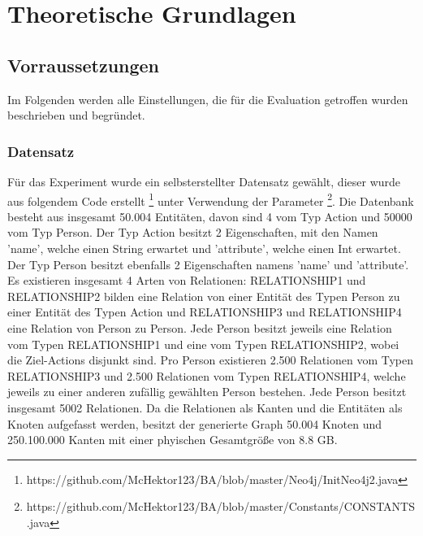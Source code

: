 
\chapter{Theoretische Grundlagen} %

\label{Kaptiel3} %

\section{Vorraussetzungen}
Im Folgenden werden alle Einstellungen, die für die Evaluation getroffen wurden beschrieben und begründet. 
\subsection{Datensatz}
Für das Experiment wurde ein selbsterstellter Datensatz gewählt, dieser wurde aus folgendem Code erstellt \footnote{https://github.com/McHektor123/BA/blob/master/Neo4j/InitNeo4j2.java} unter Verwendung der Parameter \footnote{https://github.com/McHektor123/BA/blob/master/Constants/CONSTANTS.java}. Die Datenbank besteht aus insgesamt 50.004 Entitäten, davon sind 4  vom Typ Action und  50000  vom Typ Person. Der Typ Action besitzt  2 Eigenschaften, mit den Namen 'name', welche einen String erwartet  und 'attribute', welche einen Int erwartet. Der Typ Person besitzt ebenfalls 2 Eigenschaften namens 'name' und 'attribute'. \newline
Es existieren insgesamt 4 Arten von Relationen: RELATIONSHIP1 und RELATIONSHIP2 bilden eine Relation von einer Entität des Typen Person zu einer Entität des Typen Action  und  RELATIONSHIP3 und RELATIONSHIP4 eine Relation von Person zu Person. Jede Person besitzt jeweils eine Relation vom Typen RELATIONSHIP1 und eine vom Typen RELATIONSHIP2, wobei die Ziel-Actions disjunkt sind. Pro Person existieren 2.500 Relationen vom Typen RELATIONSHIP3 und 2.500 Relationen vom Typen RELATIONSHIP4, welche jeweils zu einer anderen zufällig gewählten Person bestehen. Jede Person besitzt insgesamt 5002 Relationen. Da die Relationen als Kanten und die Entitäten als Knoten aufgefasst werden, besitzt der generierte Graph 50.004 Knoten und 250.100.000 Kanten mit einer phyischen Gesamtgröße von 8.8 GB. 
